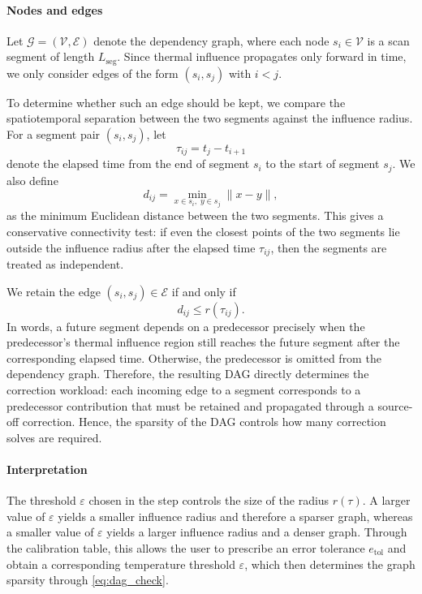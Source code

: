\documentclass[conference]{IEEEtran}
\begin{document}
\paragraph{Nodes and edges}
Let $\mathcal{G} = (\mathcal{V},\mathcal{E})$ denote the dependency graph, where each node $s_i \in \mathcal{V}$ is a scan segment of length $L_{\mathrm{seg}}$. Since thermal influence propagates only forward in time, we only consider edges of the form $(s_i,s_j)$ with $i<j$.

To determine whether such an edge should be kept, we compare the spatiotemporal separation between the two segments against the influence radius. For a segment pair $(s_i,s_j)$, let
\begin{equation}
\tau_{ij} = t_j - t_{i+1}
\label{eq:tauij}
\end{equation}
denote the elapsed time from the end of segment $s_i$ to the start of segment $s_j$. We also define
\begin{equation}
d_{ij} = \min_{x \in s_i,\; y \in s_j} \|x-y\|,
\label{eq:dij}
\end{equation}
as the minimum Euclidean distance between the two segments. This gives a conservative connectivity test: if even the closest points of the two segments lie outside the influence radius after the elapsed time $\tau_{ij}$, then the segments are treated as independent.

We retain the edge $(s_i,s_j)\in\mathcal{E}$ if and only if
\begin{equation}
d_{ij} \le r(\tau_{ij}).
\label{eq:dag_check}
\end{equation}
In words, a future segment depends on a predecessor precisely when the predecessor's thermal influence region still reaches the future segment after the corresponding elapsed time. Otherwise, the predecessor is omitted from the dependency graph. Therefore, the resulting DAG directly determines the correction workload: each incoming edge to a segment corresponds to a predecessor contribution that must be retained and propagated through a source-off correction. Hence, the sparsity of the DAG controls how many correction solves are required.

\paragraph{Interpretation}
The threshold $\varepsilon$ chosen in the  step controls the size of the radius $r(\tau)$. A larger value of $\varepsilon$ yields a smaller influence radius and therefore a sparser graph, whereas a smaller value of $\varepsilon$ yields a larger influence radius and a denser graph. Through the calibration table, this allows the user to prescribe an error tolerance $e_{\mathrm{tol}}$ and obtain a corresponding temperature threshold $\varepsilon$, which then determines the graph sparsity through \cref{eq:dag_check}.
\end{document}

